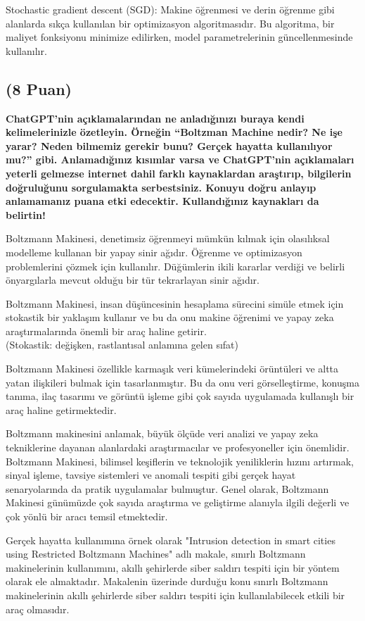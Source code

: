 \documentclass[11pt]{article}
\begin{document}
Stochastic gradient descent (SGD): Makine öğrenmesi ve derin öğrenme gibi alanlarda sıkça kullanılan bir optimizasyon algoritmasıdır. Bu algoritma, bir maliyet fonksiyonu minimize edilirken, model parametrelerinin güncellenmesinde kullanılır.

\subsection{(8 Puan)} \textbf{ChatGPT’nin açıklamalarından ne anladığınızı buraya kendi kelimelerinizle özetleyin. Örneğin ``Boltzman Machine nedir? Ne işe yarar? Neden bilmemiz gerekir bunu? Gerçek hayatta kullanılıyor mu?'' gibi. Anlamadığınız kısımlar varsa ve ChatGPT’nin açıklamaları yeterli gelmezse internet dahil farklı kaynaklardan araştırıp, bilgilerin doğruluğunu sorgulamakta serbestsiniz. Konuyu doğru anlayıp anlamamanız puana etki edecektir. Kullandığınız kaynakları da belirtin!}

Boltzmann Makinesi, denetimsiz öğrenmeyi mümkün kılmak için olasılıksal modelleme kullanan bir yapay sinir ağıdır. Öğrenme ve optimizasyon problemlerini çözmek için kullanılır. Düğümlerin ikili kararlar verdiği ve belirli önyargılarla mevcut olduğu bir tür tekrarlayan sinir ağıdır.

Boltzmann Makinesi, insan düşüncesinin hesaplama sürecini simüle etmek için stokastik bir yaklaşım kullanır ve bu da onu makine öğrenimi ve yapay zeka araştırmalarında önemli bir araç haline getirir.
\\(Stokastik: değişken, rastlantısal anlamına gelen sıfat)

Boltzmann Makinesi özellikle karmaşık veri kümelerindeki örüntüleri ve altta yatan ilişkileri bulmak için tasarlanmıştır. Bu da onu veri görselleştirme, konuşma tanıma, ilaç tasarımı ve görüntü işleme gibi çok sayıda uygulamada kullanışlı bir araç haline getirmektedir. 

Boltzmann makinesini anlamak, büyük ölçüde veri analizi ve yapay zeka tekniklerine dayanan alanlardaki araştırmacılar ve profesyoneller için önemlidir. Boltzmann Makinesi, bilimsel keşiflerin ve teknolojik yeniliklerin hızını artırmak, sinyal işleme, tavsiye sistemleri ve anomali tespiti gibi gerçek hayat senaryolarında da pratik uygulamalar bulmuştur. 
Genel olarak, Boltzmann Makinesi günümüzde çok sayıda araştırma ve geliştirme alanıyla ilgili değerli ve çok yönlü bir aracı temsil etmektedir. 

Gerçek hayatta kullanımına örnek olarak "Intrusion detection in smart cities using Restricted Boltzmann Machines" adlı makale, sınırlı Boltzmann makinelerinin kullanımını, akıllı şehirlerde siber saldırı tespiti için bir yöntem olarak ele almaktadır. Makalenin üzerinde durduğu konu sınırlı Boltzmann makinelerinin akıllı şehirlerde siber saldırı tespiti için kullanılabilecek etkili bir araç olmasıdır.
\end{document}
